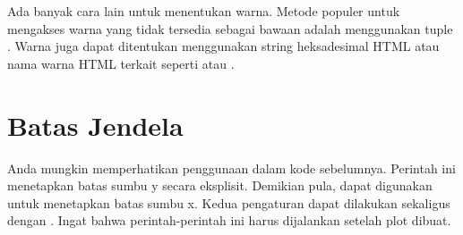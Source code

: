 Ada banyak cara lain untuk menentukan warna.
Metode populer untuk mengakses warna yang tidak tersedia sebagai bawaan adalah menggunakan tuple .
Warna juga dapat ditentukan menggunakan string heksadesimal HTML atau nama warna HTML terkait seperti  atau .

\section*{Batas Jendela} %

Anda mungkin memperhatikan penggunaan  dalam kode sebelumnya. Perintah ini menetapkan batas sumbu y secara eksplisit. Demikian pula,  dapat digunakan untuk menetapkan batas sumbu x.
Kedua pengaturan dapat dilakukan sekaligus dengan .
Ingat bahwa perintah-perintah ini harus dijalankan setelah plot dibuat.

